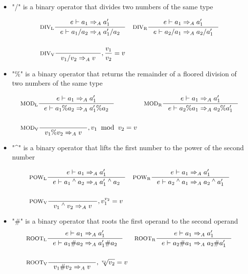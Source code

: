 \begin{itemize}
\item "/" is a binary operator that divides two numbers of the same type

\begin{align*}
&\inference[$\text{DIV}_\text{L}$]{e \vdash a_1 \Rightarrow_A a_1'}
                    {e \vdash a_1 / a_2 \Rightarrow_A a_1' / a_2}
&
&\inference[$\text{DIV}_\text{R}$]{e \vdash a_1 \Rightarrow_A a_1'}
                    {e \vdash a_2 / a_1 \Rightarrow_A a_2 / a_1'}
\\\\
&\inference[$\text{DIV}_\text{V}$]{}
                    {v_1 / v_2 \Rightarrow_A v}
                    {, \frac{v_1}{v_2} = v}
\end{align*}

\item "\%" is a binary operator that returns the remainder of a floored division of two numbers of the same type

\begin{align*}
&\inference[$\text{MOD}_\text{L}$]{e \vdash a_1 \Rightarrow_A a_1'}
                    {e \vdash a_1 \% a_2 \Rightarrow_A a_1' \% a_2}
&
&\inference[$\text{MOD}_\text{R}$]{e \vdash a_1 \Rightarrow_A a_1'}
                    {e \vdash a_2 \% a_1 \Rightarrow_A a_2 \% a_1'}
\\\\
&\inference[$\text{MOD}_\text{V}$]{}
                    {v_1 \% v_2 \Rightarrow_A v}
                    {, v_1 \;\; \textrm{mod} \;\; v_2 = v}
\end{align*}

\item "\^{}" is a binary operator that lifts the first number to the power of the second number

\begin{align*}
&\inference[$\text{POW}_\text{L}$]{e \vdash a_1  \Rightarrow_A a_1'}
                    {e \vdash a_1 \Twedge a_2 \Rightarrow_A a_1' \Twedge a_2}
&
&\inference[$\text{POW}_\text{R}$]{e \vdash a_1 \Rightarrow_A a_1'}
                    {e \vdash a_2 \Twedge a_1 \Rightarrow_A a_2 \Twedge a_1'}
\\\\
&\inference[$\text{POW}_\text{V}$]{}
                    {v_1 \Twedge v_2 \Rightarrow_A v}
                    {, v_1 ^ {v_2} = v}
\end{align*}

\item "\#" is a binary operator that roots the first operand to the second operand
\begin{align*}
&\inference[$\text{ROOT}_\text{L}$]{e \vdash a_1 \Rightarrow_A a_1'}
                    {e \vdash a_1 \# a_2 \Rightarrow_A a_1' \# a_2}
&
&\inference[$\text{ROOT}_\text{R}$]{e \vdash a_1 \Rightarrow_A a_1'}
                    {e \vdash a_2 \# a_1 \Rightarrow_A a_2 \# a_1'}
\\\\
&\inference[$\text{ROOT}_\text{V}$]{}
                    {v_1 \# v_2 \Rightarrow_A v}
                    {, \sqrt[v_1]{v_2} = v}
\end{align*}


\end{itemize}
